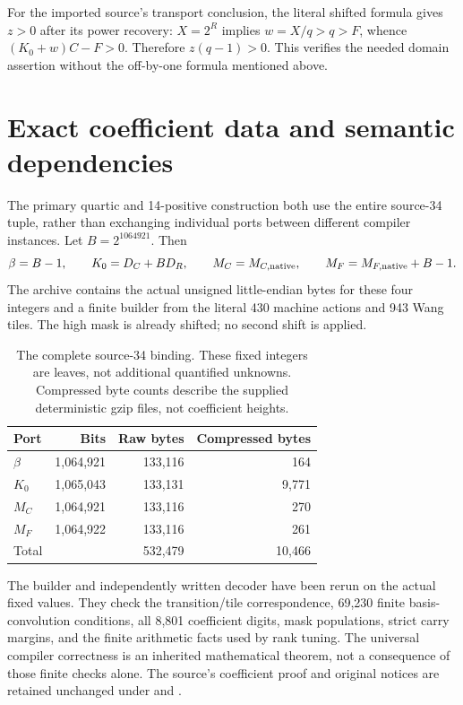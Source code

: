 \documentclass[11pt,a4paper]{article}
\theoremstyle{remark}\newtheorem{remark}[theorem]{Remark}
\begin{document}
For the imported source's transport conclusion, the literal shifted
formula gives $z>0$ after its power recovery: $X=2^R$ implies
$w=X/q>q>F$, whence $(K_0+w)C-F>0$. Therefore
$z(q-1)>0$. This verifies the needed domain assertion without the
off-by-one formula mentioned above.





\section{Exact coefficient data and semantic dependencies}
\label{sec:coefficients}

The primary quartic and 14-positive construction both use the entire
source-34 tuple, rather than exchanging individual ports between
different compiler instances. Let $B=2^{1064921}$. Then
\[
 \beta=B-1,\qquad K_0=D_C+B D_R,\qquad M_C=M_{C,\rm native},
 \qquad M_F=M_{F,\rm native}+B-1.
\]
The archive contains the actual unsigned little-endian bytes for these
four integers and a finite builder from the literal 430 machine actions
and 943 Wang tiles. The high mask is already shifted; no second shift is
applied.

\begin{table}[htbp]\centering\small
\begin{tabular}{@{}lrrr@{}}\toprule
Port & Bits & Raw bytes & Compressed bytes\\\midrule
$\beta$ &1,064,921&133,116&164\\
$K_0$ &1,065,043&133,131&9,771\\
$M_C$ &1,064,921&133,116&270\\
$M_F$ &1,064,922&133,116&261\\\midrule
Total &&532,479&10,466\\\bottomrule
\end{tabular}
\caption{The complete source-34 binding. These fixed integers are leaves,
not additional quantified unknowns. Compressed byte counts describe the
supplied deterministic gzip files, not coefficient heights.}
\end{table}

The builder and independently written decoder have been rerun on the
actual fixed values. They check the transition/tile correspondence,
69,230 finite basis-convolution conditions, all 8,801 coefficient digits,
mask populations, strict carry margins, and the finite arithmetic facts
used by rank tuning. The universal compiler correctness is an inherited
mathematical theorem, not a consequence of those finite checks alone.
The source's coefficient proof and original notices are retained unchanged
under  and .
\end{document}

